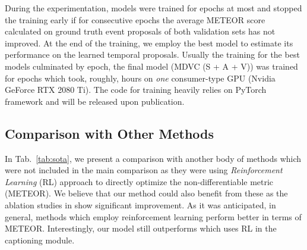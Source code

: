 \documentclass[10pt,twocolumn,letterpaper]{article}
\begin{document}
During the experimentation, models were trained for  epochs at most and stopped the training early if for  consecutive epochs the average METEOR score calculated on ground truth event proposals of both validation sets has not improved. At the end of the training, we employ the best model to estimate its performance on the learned temporal proposals. Usually the training for the best models culminated by  epoch, \eg the final model (MDVC (S + A + V)) was trained for  epochs which took, roughly,  hours on \textit{one} consumer-type GPU (Nvidia GeForce RTX 2080 Ti). The code for training heavily relies on PyTorch framework and will be released upon publication.

\subsection{Comparison with Other Methods} \label{sec:other_methods}
In Tab.~\ref{tab:sota}, we present a comparison with another body of methods \cite{Xiong2018,Mun2019} which were not included in the main comparison as they were using \textit{Reinforcement Learning} (RL) approach to directly optimize the non-differentiable metric (METEOR). We believe that our method could also benefit from these as the ablation studies in \cite{Xiong2018,Mun2019} show significant improvement. As it was anticipated, in general, methods which employ reinforcement learning perform better in terms of METEOR. Interestingly, our model still outperforms \cite{Xiong2018} which uses RL in the captioning module.
\end{document}

